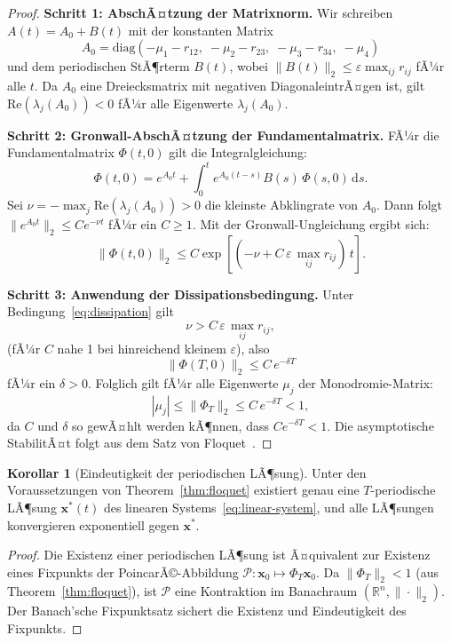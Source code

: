 ﻿\documentclass[12pt, a4paper]{article}
\theoremstyle{definition}
\newtheorem{korollar}[theorem]{Korollar}
\newcommand{\R}{\mathbb{R}}
\newcommand{\dd}{\mathrm{d}}
\begin{document}
\begin{proof}
\textbf{Schritt 1: AbschÃ¤tzung der Matrixnorm.}
Wir schreiben $A(t) = A_0 + B(t)$ mit der konstanten Matrix
\[
  A_0 = \mathrm{diag}(-\mu_1 - r_{12},\; -\mu_2 - r_{23},\; -\mu_3 - r_{34},\; -\mu_4)
\]
und dem periodischen StÃ¶rterm $B(t)$, wobei $\|B(t)\|_2 \leq \varepsilon \max_{ij} r_{ij}$
fÃ¼r alle $t$. Da $A_0$ eine Dreiecksmatrix mit negativen DiagonaleintrÃ¤gen ist,
gilt $\mathrm{Re}(\lambda_j(A_0)) < 0$ fÃ¼r alle Eigenwerte $\lambda_j(A_0)$.

\textbf{Schritt 2: Gronwall-AbschÃ¤tzung der Fundamentalmatrix.}
FÃ¼r die Fundamentalmatrix $\Phi(t,0)$ gilt die Integralgleichung:
\[
  \Phi(t,0) = e^{A_0 t} + \int_0^t e^{A_0(t-s)} B(s)\,\Phi(s,0)\,\dd s.
\]
Sei $\nu = -\max_j \mathrm{Re}(\lambda_j(A_0)) > 0$ die kleinste Abklingrate
von $A_0$. Dann folgt $\|e^{A_0 t}\|_2 \leq C e^{-\nu t}$ fÃ¼r ein $C \geq 1$.
Mit der Gronwall-Ungleichung ergibt sich:
\[
  \|\Phi(t,0)\|_2 \leq C \exp\!\left[(-\nu + C\,\varepsilon\,\max_{ij} r_{ij})\, t\right].
\]

\textbf{Schritt 3: Anwendung der Dissipationsbedingung.}
Unter Bedingung~\eqref{eq:dissipation} gilt
\[
  \nu > C\,\varepsilon\,\max_{ij} r_{ij},
\]
(fÃ¼r $C$ nahe 1 bei hinreichend kleinem $\varepsilon$), also
\[
  \|\Phi(T,0)\|_2 \leq C\, e^{-\delta T}
\]
fÃ¼r ein $\delta > 0$. Folglich gilt fÃ¼r alle Eigenwerte $\mu_j$ der
Monodromie-Matrix:
\[
  |\mu_j| \leq \|\Phi_T\|_2 \leq C\, e^{-\delta T} < 1,
\]
da $C$ und $\delta$ so gewÃ¤hlt werden kÃ¶nnen, dass $Ce^{-\delta T} < 1$.
Die asymptotische StabilitÃ¤t folgt aus dem Satz von Floquet~\cite{Floquet1883,Grimshaw1990}.
\hfill
\end{proof}

\begin{korollar}[Eindeutigkeit der periodischen LÃ¶sung]\label{cor:eindeutigkeit}
Unter den Voraussetzungen von Theorem~\ref{thm:floquet} existiert genau eine
$T$-periodische LÃ¶sung $\bm{x}^*(t)$ des linearen Systems~\eqref{eq:linear-system},
und alle LÃ¶sungen konvergieren exponentiell gegen $\bm{x}^*$.
\end{korollar}

\begin{proof}
Die Existenz einer periodischen LÃ¶sung ist Ã¤quivalent zur Existenz eines
Fixpunkts der PoincarÃ©-Abbildung $\mathcal{P}: \bm{x}_0 \mapsto \Phi_T \bm{x}_0$.
Da $\|\Phi_T\|_2 < 1$ (aus Theorem~\ref{thm:floquet}), ist $\mathcal{P}$ eine
Kontraktion im Banachraum $(\R^n, \|\cdot\|_2)$. Der Banach'sche Fixpunktsatz
sichert die Existenz und Eindeutigkeit des Fixpunkts. \hfill
\end{proof}
\end{document}
